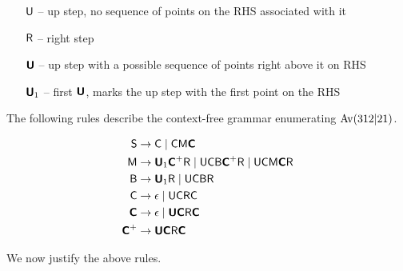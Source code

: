 \begin{enumerate}
\item[$\fU$ --] up step, no sequence of points on the RHS associated with it
\item[$\fR$ --] right step
\item[$\bU$ --] up step with a possible sequence of points right above it on RHS
\item[$\bU_1$ --] first $\bU$, marks the up step with the first point on the RHS
\end{enumerate}

\noindent The following rules describe the context-free grammar enumerating $\Av(312|21)$.  

\begin{align*}
\fS &\to \fC \mid \fC\fM\bC\\
\fM &\to \bU_1\bC^+\fR \mid \fU\fC\fB\bC^+\fR \mid \fU\fC\fM\bC\fR\\
\fB &\to \bU_1\fR \mid \fU\fC\fB\fR\\
\fC &\to \epsilon \mid \fU\fC\fR\fC\\
\bC &\to \epsilon \mid \bU\bC\fR\bC\\
\bC^+ &\to \bU\bC\fR\bC
\end{align*}

\noindent We now justify the above rules.

